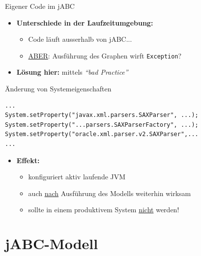 \begin{frame}[fragile]{Eigener Code im jABC}
\begin{itemize}
	\item \textbf{Unterschiede in der Laufzeitumgebung:} 
	\begin{itemize}
			\item Code läuft ausserhalb von jABC...
			\item \underline{ABER}: Ausführung des Graphen wirft \texttt{Exception}?
	\end{itemize}
	\pause
	\item \textbf{Lösung hier:} mittels \textit{"`bad Practice"'}
\end{itemize}

\begin{block}{Änderung von Systemeigenschaften}
\javalstset
\begin{lstlisting}
...
System.setProperty("javax.xml.parsers.SAXParser", ...);
System.setProperty("...parsers.SAXParserFactory", ...);
System.setProperty("oracle.xml.parser.v2.SAXParser",...
...
\end{lstlisting}
\end{block}

\begin{itemize}
	\item \textbf{Effekt:}
		\begin{itemize}
			\item konfiguriert aktiv laufende JVM
			\item auch \underline{nach} Ausführung des Modells weiterhin wirksam
			\item sollte in einem produktivem System \underline{nicht} werden!
		\end{itemize}
\end{itemize}
\end{frame}


\section{jABC-Modell}

